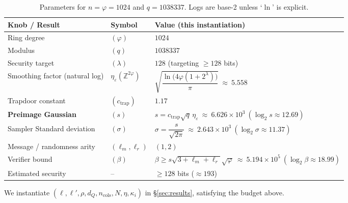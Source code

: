 \begin{table}[H]
\centering
\renewcommand{\arraystretch}{1.15}
\begin{tabular}{@{}lll@{}}
\toprule
\textbf{Knob / Result} & \textbf{Symbol} & \textbf{Value (this instantiation)} \\
\midrule
Ring degree & $(\varphi)$ & $1024$ \\
Modulus & $(q)$ & $1038337$ \\
Security target & $(\lambda)$ & $128$ (targeting $\ge 128$ bits) \\
\midrule
Smoothing factor (natural log) & $\eta_\varepsilon(\mathbb{Z}^{2\varphi})$ & $\sqrt{\dfrac{\ln\!\bigl(4\varphi(1+2^\lambda)\bigr)}{\pi}}\ \approx\ 5.558$ \\
Trapdoor constant & $(c_{\mathrm{trap}})$ & $1.17$ \\
\textbf{Preimage Gaussian} & $(s)$ & $s=c_{\mathrm{trap}}\sqrt{q}\,\eta_\varepsilon\ \approx\ 6.626\times 10^3\ (\log_2 s \approx 12.69)$ \\
Sampler Standard deviation & $(\sigma)$ & $\sigma=\dfrac{s}{\sqrt{2\pi}}\ \approx\ 2.643\times 10^3\ (\log_2 \sigma \approx 11.37)$ \\
\midrule
Message / randomness arity & $(\ell_m,\ell_r)$ & $(1,2)$ \\
Verifier bound & $(\beta)$ & $\beta \ge s\sqrt{3+\ell_m+\ell_r}\sqrt{\varphi}\ \approx\ 5.194\times 10^5\ (\log_2 \beta \approx 18.99)$ \\
\midrule
Estimated security & -- & $\ge 128$ bits ($\approx 193$) \\
\bottomrule
\end{tabular}
\caption{Parameters for $n=\varphi=1024$ and $q=1038337$. Logs are base-2 unless `$\ln$' is explicit.}
\label{tab:lattice-params}
\end{table}

We instantiate $(\ell,\ell',\rho,d_Q,n_{\mathrm{cols}},N,\eta,\kappa_i)$ in \S\ref{sec:results}, satisfying the budget above.
